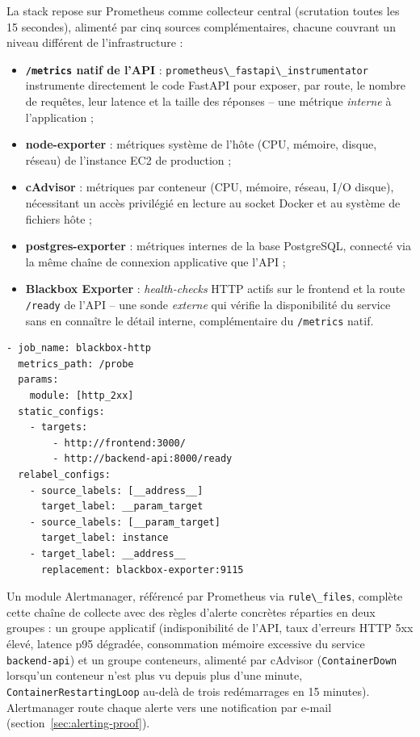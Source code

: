 \documentclass[11pt,a4paper]{report}
\newcommand{\code}[1]{\lstinline{#1}}
\begin{document}
La stack repose sur Prometheus comme collecteur central (scrutation toutes les 15 secondes), alimenté par cinq sources complémentaires, chacune couvrant un niveau différent de l'infrastructure :

\begin{itemize}
  \item \textbf{\code{/metrics} natif de l'API} : \code{prometheus\_fastapi\_instrumentator} instrumente directement le code FastAPI pour exposer, par route, le nombre de requêtes, leur latence et la taille des réponses -- une métrique \emph{interne} à l'application ;
  \item \textbf{node-exporter} : métriques système de l'hôte (CPU, mémoire, disque, réseau) de l'instance EC2 de production ;
  \item \textbf{cAdvisor} : métriques par conteneur (CPU, mémoire, réseau, I/O disque), nécessitant un accès privilégié en lecture au socket Docker et au système de fichiers hôte ;
  \item \textbf{postgres-exporter} : métriques internes de la base PostgreSQL, connecté via la même chaîne de connexion applicative que l'API ;
  \item \textbf{Blackbox Exporter} : \emph{health-checks} HTTP actifs sur le frontend et la route \code{/ready} de l'API -- une sonde \emph{externe} qui vérifie la disponibilité du service sans en connaître le détail interne, complémentaire du \code{/metrics} natif.
\end{itemize}

\begin{lstlisting}[caption={\code{monitoring/prometheus/prometheus.yml} -- health-checks HTTP via Blackbox Exporter}]
- job_name: blackbox-http
  metrics_path: /probe
  params:
    module: [http_2xx]
  static_configs:
    - targets:
        - http://frontend:3000/
        - http://backend-api:8000/ready
  relabel_configs:
    - source_labels: [__address__]
      target_label: __param_target
    - source_labels: [__param_target]
      target_label: instance
    - target_label: __address__
      replacement: blackbox-exporter:9115
\end{lstlisting}

Un module Alertmanager, référencé par Prometheus via \code{rule\_files}, complète cette chaîne de collecte avec des règles d'alerte concrètes réparties en deux groupes : un groupe applicatif (indisponibilité de l'API, taux d'erreurs HTTP 5xx élevé, latence p95 dégradée, consommation mémoire excessive du service \code{backend-api}) et un groupe conteneurs, alimenté par cAdvisor (\code{ContainerDown} lorsqu'un conteneur n'est plus vu depuis plus d'une minute, \code{ContainerRestartingLoop} au-delà de trois redémarrages en 15 minutes). Alertmanager route chaque alerte vers une notification par e-mail (section~\ref{sec:alerting-proof}).
\end{document}
